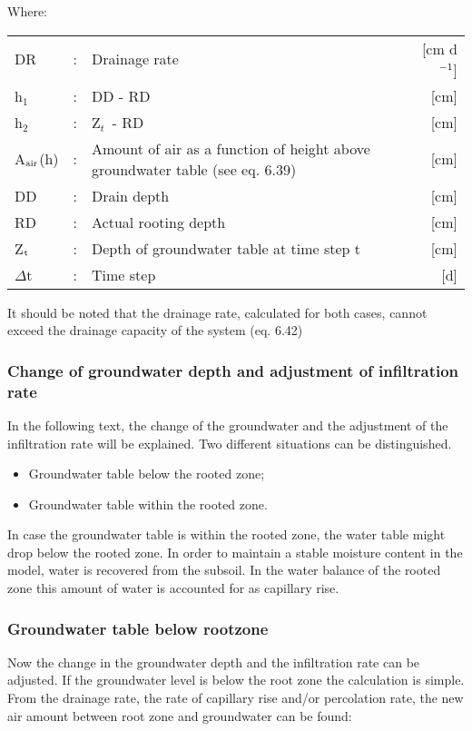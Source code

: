 Where:\\[5pt]
\begin{tabularx}{\textwidth}{llXr}
DR &:& Drainage rate  & [cm d$^{{\rm -1}}$]\\
h$_{1}$ &:& DD - RD & [cm]\\
h$_{2}$ &:& Z$_{t~}$ - RD & [cm]\\
A$_{{\rm air}}$(h) &:& Amount of air as a function of height above groundwater
   table  (see eq. 6.39) & [cm]\\
DD &:& Drain depth  & [cm]\\
RD &:& Actual rooting depth  & [cm]\\
Z$_{{\rm t}}$ &:& Depth of groundwater table at time step t  & [cm]\\
$\Delta$t &:& Time step  & [d]\\
\end{tabularx}

It should be noted that the drainage rate, calculated for both cases, cannot exceed the
drainage capacity of the system (eq. 6.42)

\subsubsection{Change of groundwater depth and adjustment of infiltration rate}

In the following text, the change of the groundwater and the adjustment of the infiltration
rate will be explained. Two different situations can be distinguished.
\begin{itemize}
\item Groundwater table below the rooted zone;
\item Groundwater table within the rooted zone.
\end{itemize}

In case the groundwater table is within the rooted zone, the water table might drop below
the rooted zone. In order to maintain a stable moisture content in the model, water is
recovered from the subsoil. In the water balance of the rooted zone this amount of water
is accounted for as capillary rise.

\subsubsection{Groundwater table below rootzone}
Now the change in the groundwater depth and the infiltration rate can be adjusted. If the
groundwater level is below the root zone the calculation is simple. From the drainage
rate, the rate of capillary rise and/or percolation rate, the new air amount between root
zone and groundwater can be found:

